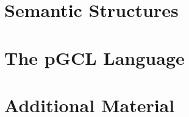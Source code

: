 \documentclass[11pt,a4paper]{book}
\begin{document}
\chapter{Semantic Structures}
\label{c:semantics}




\chapter{The pGCL Language}
\label{c:language}













\backmatter

\chapter{Additional Material}
\label{c:additional}




\end{document}
